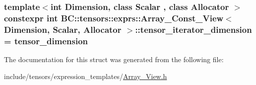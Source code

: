 \subsubsection[{\texorpdfstring{tensor\+\_\+iterator\+\_\+dimension}{tensor_iterator_dimension}}]{\setlength{\rightskip}{0pt plus 5cm}template$<$int Dimension, class Scalar , class Allocator $>$ constexpr int {\bf B\+C\+::tensors\+::exprs\+::\+Array\+\_\+\+Const\+\_\+\+View}$<$ Dimension, {\bf Scalar}, {\bf Allocator} $>$\+::tensor\+\_\+iterator\+\_\+dimension = {\bf tensor\+\_\+dimension}\hspace{0.3cm}{\ttfamily [static]}}\hypertarget{structBC_1_1tensors_1_1exprs_1_1Array__Const__View_ac2bcaa8bbfbdfb0ae6d232f1b3fdb340}{}\label{structBC_1_1tensors_1_1exprs_1_1Array__Const__View_ac2bcaa8bbfbdfb0ae6d232f1b3fdb340}


The documentation for this struct was generated from the following file\+:\begin{DoxyCompactItemize}
\item 
include/tensors/expression\+\_\+templates/\hyperlink{Array__View_8h}{Array\+\_\+\+View.\+h}\end{DoxyCompactItemize}
